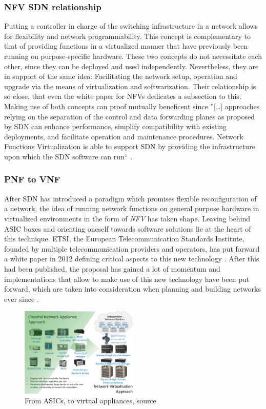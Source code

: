 \subsubsection{NFV SDN relationship}
Putting a controller in charge of the switching infrastructure in a network allows for flexibility and network programmability. This concept is complementary to that of providing functions in a virtualized manner that have previously been running on purpose-specific hardware. These two concepts do not necessitate each other, since they can be deployed and used independently. Nevertheless, they are in support of the same idea: Facilitating the network setup, operation and upgrade via the means of virtualization and softwarization. Their relationship is so close, that even the white paper for NFVs dedicates a subsection to this. Making use of both concepts can proof mutually beneficent since ''[\dots] approaches relying on the separation of the control and data forwarding planes as proposed by SDN can enhance performance, simplify compatibility with existing deployments, and facilitate operation and maintenance procedures. Network Functions Virtualization is able to support SDN by providing the infrastructure upon which the SDN software can run`` \cite{nfv_wp}. 


\subsubsection{PNF to VNF}
After SDN has introduced a paradigm which promises flexible reconfiguration of a network, the idea of running network functions on general purpose hardware in virtualized environments in the form of \textit{NFV} has taken shape. Leaving behind ASIC boxes and orienting oneself towards software solutions lie at the heart of this technique. ETSI, the European Telecommunication Standards Institute, founded by multiple telecommunication providers and operators, has put forward a white paper in 2012 defining critical aspects to this new technology \cite{nfv_wp}. After this had been published, the proposal has gained a lot of momentum and implementations that allow to make use of this new technology have been put forward, which are taken into consideration when planning and building networks ever since \cite{ordonez2017network}.

\begin{figure}[h]
	\centering
	\includegraphics[width=0.5\textwidth]{images/nfv.png}
	\caption{From ASICs, to virtual appliances, source \cite{nfv_wp}}
	\label{img:nfv_wp}
\end{figure}

